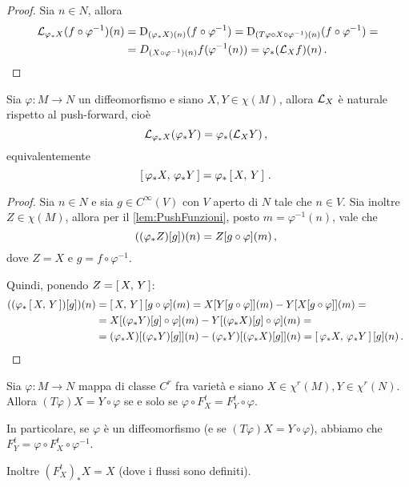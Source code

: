\begin{proof}
	Sia $n\in N$, allora
	\begin{align*}
		\mathcal L_{\varphi_*X}(f\circ \varphi^{-1})(n)&=\mathrm D_{(\varphi_*X)(n)}(f\circ \varphi^{-1})=\mathrm D_{(T\varphi \circ X \circ\varphi^{-1})(n)}(f\circ \varphi^{-1})=\\
		&=D_{(X\circ \varphi^{-1})(n)} f(\varphi^{-1}(n))=\varphi_*(\mathcal L_Xf)(n)\, \text{. }
	\end{align*}
\end{proof}


\begin{proposition}
	Sia $\varphi:M\to N$ un diffeomorfismo e siano $X,Y\in\chi(M)$, allora $\mathcal L_X$ è naturale rispetto al push-forward, cioè
	\begin{equation*}
		\mathcal L_{\varphi_*X}(\varphi_*Y)=\varphi_*(\mathcal L_XY)\, \text{, }
	\end{equation*}
	equivalentemente
	\begin{equation*}
		\left[\,\varphi_*X,\,\varphi_*Y\,\right]=\varphi_*\left[\,X,\,Y\,\right]\, \text{. }
	\end{equation*}
\end{proposition}

\begin{proof}
	Sia $n\in N$ e sia $g\in C^\infty(V)$ con $V$ aperto di $N$ tale che $n\in V$. Sia inoltre $Z\in\chi(M)$, allora per il \cref{lem:PushFunzioni}, posto $m=\varphi^{-1}(n)$, vale che
	\begin{equation*}
		((\varphi_*Z)[g])(n)=Z[g\circ \varphi](m)\, \text{, }
	\end{equation*}
	dove $Z=X$ e $g=f\circ \varphi^{-1}$.
	
	Quindi, ponendo $Z=\left[\,X,\,Y\,\right]$:
	\begin{align*}
	((\varphi_*\left[\,X,\,Y\,\right])[g])(n)&=\left[\,X,\,Y\,\right][g\circ \varphi](m)=X[Y[g\circ \varphi]](m)-Y[X[g\circ \varphi]](m)=\\
	&=X[(\varphi_*Y)[g]\circ \varphi](m)-Y[(\varphi_*X)[g]\circ \varphi](m) =\\
	&= (\varphi_*X)[(\varphi_*Y)[g]](n)-(\varphi_*Y)[(\varphi_*X)[g]](n) = \left[\,\varphi_* X,\,\varphi_* Y\,\right][g](n)\, \text{. }
	\end{align*}
\end{proof}

\begin{lemma} \label{lemma:FlussiEMappe}
	Sia $\varphi:M\to N$ mappa di classe $C^r$ fra varietà e siano $X\in\chi^r(M),Y\in\chi^r(N)$. Allora $(T\varphi)X=Y\circ \varphi$ se e solo se $\varphi\circ F_X^t=F_Y^t\circ\varphi$.
	
	In particolare, se $\varphi$ è un diffeomorfismo (e se $(T\varphi)X=Y\circ \varphi$), abbiamo che \\
	$F_Y^t=\varphi\circ F_X^t\circ \varphi^{-1}$.
	
	Inoltre $(F_X^t)_*X=X$ (dove i flussi sono definiti).
\end{lemma}

